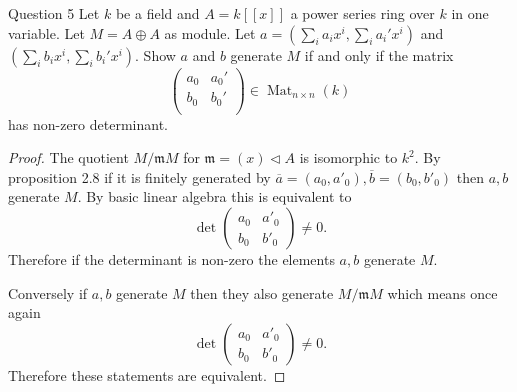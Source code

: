 \documentclass{article}
\DeclareMathOperator{\Mat}{Mat}
\newcommand{\maxid}{\mathfrak{m}}
\newcommand{\ideal}{\triangleleft}
\newenvironment{question}[1][]{\begin{paragraph}{Question #1}}{\end{paragraph}}
\theoremstyle{definition}
\begin{document}
\begin{question}[5]
    Let \(k\) be a field and \(A=k[[x]]\) a power series ring over \(k\) in one
    variable. Let \(M=A\oplus A\) as module. Let
    \(a=(\sum_{i}a_{i}x^{i},\sum_{i}a_{i}'x^{i})\) and
    \((\sum_{i}b_{i}x^{i},\sum_{i}b_{i}'x^{i})\). Show \(a\) and \(b\) generate
    \(M\) if and only if the matrix
    \[
        \begin{pmatrix}
            a_{0} & a_{0}' \\
            b_{0} & b_{0}' \\
        \end{pmatrix}\in\Mat_{n\times n}(k)
    \]
    has non-zero determinant.

    \begin{proof}
        The quotient \(M/\maxid M\) for \(\maxid=(x)\ideal A\) is isomorphic to
        \(k^{2}\). By proposition 2.8 if it is finitely generated by
        \(\overline{a}=(a_{0},a'_{0}),\overline{b}=(b_{0},b'_{0})\) then \(a,b\)
        generate \(M\). By basic linear algebra this is equivalent to
        \[
            \det\begin{pmatrix}
                a_{0} & a'_{0} \\
                b_{0} & b'_{0}
            \end{pmatrix}\neq0.
        \]
        Therefore if the determinant is non-zero the elements \(a,b\) generate
        \(M\).

        Conversely if \(a,b\) generate \(M\) then they also generate
        \(M/\maxid M\) which means once again
        \[
            \det\begin{pmatrix}
                a_{0} & a'_{0} \\
                b_{0} & b'_{0}
            \end{pmatrix}\neq0.
        \]
        Therefore these statements are equivalent.
    \end{proof}
\end{question}
\end{document}
